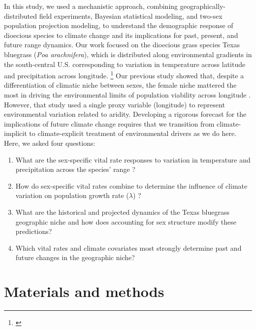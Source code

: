 \documentclass[12pt]{article}\usepackage[]{graphicx}\usepackage[dvipsnames]{xcolor}
\newcommand{\tom}[2]{{\color{red}{#1}}\footnote{\textit{\color{red}{#2}}}}
\begin{document}
In this study, we used a mechanistic approach, combining geographically-distributed field experiments, Bayesian statistical modeling, and two-sex population projection modeling, to understand the demographic response of dioecious species to climate change and its implications for past, present, and future range dynamics. 
Our work focused on the dioecious grass species Texas bluegrass (\textit{Poa arachnifera}), which is distributed along environmental gradients in the south-central U.S. corresponding to variation in temperature across latitude and precipitation across longitude. 
\tom{}{I think it would be good to add some context about climate change in this study region -- what has already occurred and what is projected.}
Our previous study showed that, despite a differentiation of climatic niche between sexes, the female niche mattered the most in driving the environmental limits of population viability across longitude \citep{miller2022two}. 
However, that study used a single proxy variable (longitude) to represent environmental variation related to aridity. 
Developing a rigorous forecast for the implications of future climate change requires that we transition from climate-implicit to climate-explicit treatment of environmental drivers as we do here.
Here, we asked four questions: 
\begin{enumerate}
	\item What are the sex-specific vital rate responses to variation in temperature and precipitation across the species' range ?
	\item How do sex-specific vital rates combine to determine the influence of climate variation on population growth rate ($\lambda$) ?
	\item What are the historical and projected dynamics of the Texas bluegrass geographic niche and how does accounting for sex structure modify these predictions?
	\item Which vital rates and climate covariates most strongly determine past and future changes in the geographic niche?
\end{enumerate}

\section*{Materials and methods}
\end{document}
